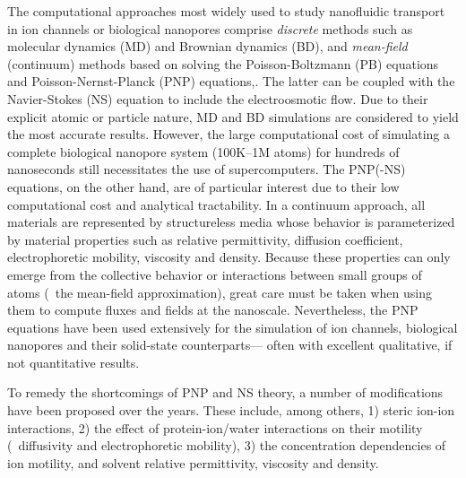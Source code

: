 \documentclass[journal=ancac3,manuscript=article,etalmode=truncate,maxauthors=0,layout=onecolumn]{achemso}
\begin{document}
The computational approaches most widely used to study nanofluidic transport in ion channels or biological
nanopores comprise \emph{discrete} methods such as molecular dynamics
(MD)\cite{Lynden-Bell-1996,Allen-1999,Aksimentiev-2005,Luan-2008,Bhattacharya-2011,Zhang-2014,DiMarino-2015,Belkin-2016}
and Brownian dynamics
(BD),\cite{Schirmer-1999,Im-2002,Noskov-2004,Millar-2008,Egwolf-2010,DeBiase-2015,Pederson-2015} and
\emph{mean-field} (continuum) methods based on solving the Poisson-Boltzmann (PB)
equations\cite{Grochowski-2008, Baldessari-2008-1} and Poisson-Nernst-Planck (PNP)
equations,\cite{Eisenberg-1996,Gillespie-2002, Simakov-2010}. The latter can be coupled with the Navier-Stokes
(NS) equation to include the electroosmotic flow.\cite{Lu-2012,Pederson-2015} Due to their explicit atomic or
particle nature, MD and BD simulations are considered to yield the most accurate results. However, the large
computational cost of simulating a complete biological nanopore system (100K--1M atoms) for hundreds of
nanoseconds still necessitates the use of supercomputers.\cite{Aksimentiev-2005,Bhattacharya-2011} The
PNP(-NS) equations, on the other hand, are of particular interest due to their low computational cost and
analytical tractability. In a continuum approach, all materials are represented by structureless media whose
behavior is parameterized by material properties such as relative permittivity, diffusion coefficient,
electrophoretic mobility, viscosity and density. Because these properties can only emerge from the collective
behavior or interactions between small groups of atoms (\ie~the mean-field approximation), great care must
be taken when using them to compute fluxes and fields at the nanoscale.\cite{Corry-2000,Collins-2012}
Nevertheless, the PNP equations have been used extensively for the simulation of ion
channels,\cite{Im-2002,Furini-2006,Liu-2015} biological
nanopores\cite{Simakov-2010,Pederson-2015,Aguilella-Arzo-2017,Simakov-2018} and their solid-state
counterparts\cite{Cervera-2005,White-2008,Chaudhry-2014,Laohakunakorn-2015}--- often with excellent
qualitative, if not quantitative results.\cite{Maffeo-2012,Thomas-2014,Kim-2015}

To remedy the shortcomings of PNP and NS theory, a number of modifications have been proposed over the years.
These include, among others, 1) steric ion-ion interactions, 2) the effect of protein-ion/water interactions
on their motility (\ie~diffusivity and electrophoretic mobility), 3) the concentration dependencies of ion
motility, and solvent relative permittivity, viscosity and density.
\end{document}
